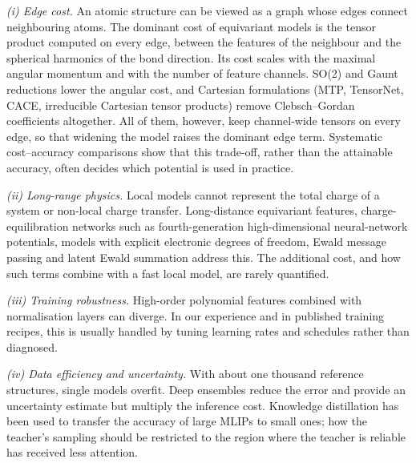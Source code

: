 \documentclass[journal=jctcce,manuscript=article,layout=traditional]{achemso}
\begin{document}
\emph{(i) Edge cost.} An atomic structure can be viewed as a graph whose edges connect neighbouring atoms. The
dominant cost of equivariant models is the tensor product computed on every edge, between the features of the
neighbour and the spherical harmonics of the bond direction. Its cost scales with the maximal angular momentum and
with the number of feature channels. SO(2) and Gaunt reductions\cite{passaro2023escn,luo2024gaunt} lower the
angular cost, and Cartesian formulations (MTP, TensorNet\cite{simeon2023tensornet}, CACE\cite{cheng2024cace},
irreducible Cartesian tensor products\cite{zaverkin2024ictp}) remove Clebsch--Gordan coefficients altogether. All of
them, however, keep channel-wide tensors on every edge, so that widening the model raises the dominant edge term.
Systematic cost--accuracy comparisons\cite{zuo2020benchmark} show that this trade-off, rather than the attainable
accuracy, often decides which potential is used in practice.

\emph{(ii) Long-range physics.} Local models cannot represent the total charge of a system or non-local charge
transfer. Long-distance equivariant features\cite{grisafi2019lode}, charge-equilibration networks such as
fourth-generation high-dimensional neural-network potentials\cite{ko2021}, models with explicit electronic
degrees of freedom\cite{unke2021spookynet}, Ewald message passing\cite{kosmala2023ewaldmp} and latent Ewald
summation\cite{cheng2024les} address this. The additional cost, and how such terms combine with a fast local model,
are rarely quantified.

\emph{(iii) Training robustness.} High-order polynomial features combined with normalisation layers can diverge. In
our experience and in published training recipes, this is usually handled by tuning learning rates and schedules
rather than diagnosed.

\emph{(iv) Data efficiency and uncertainty.} With about one thousand reference structures, single models overfit.
Deep ensembles\cite{lakshminarayanan2017} reduce the error and provide an uncertainty estimate but multiply the
inference cost. Knowledge distillation\cite{hinton2015distill} has been used to transfer the accuracy of large MLIPs
to small ones\cite{gardner2025distill,grace2025distill}; how the teacher's sampling should be restricted to the
region where the teacher is reliable has received less attention.
\end{document}
